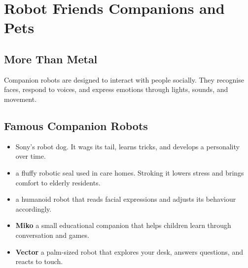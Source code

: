 
\chapter{Robot Friends \textemdash{} Companions and Pets}


\section*{More Than Metal}


Companion robots are designed to interact with people socially. They
recognise faces, respond to voices, and express emotions through lights,
sounds, and movement.

\sectionrule

\section*{Famous Companion Robots}

\begin{itemize}
  \item \textbf{} \textemdash{} Sony's robot dog. It wags its tail,
    learns tricks, and develops a personality over time.
  \item \textbf{} \textemdash{} a fluffy robotic seal used in care homes.
    Stroking it lowers stress and brings comfort to elderly residents.
  \item \textbf{} \textemdash{} a humanoid robot that reads facial
    expressions and adjusts its behaviour accordingly.
  \item \textbf{Miko} \textemdash{} a small educational companion that helps
    children learn through conversation and games.
  \item \textbf{Vector} \textemdash{} a palm-sized robot that explores your desk,
    answers questions, and reacts to touch.
\end{itemize}

